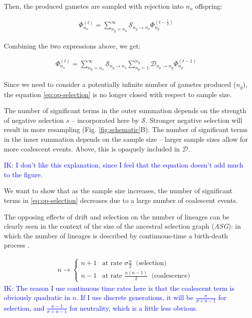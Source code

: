 \documentclass[review]{elsarticle}
\newcommand{\ra}{\rightarrow}
\newcommand{\afs}[2]{\Phi_{#1}^{(#2)}}
\newcommand{\ikcomment}[1]{\textcolor{blue}{IK: #1}}
\begin{document}
Then, the produced gametes are sampled with rejection into $n_o$ offspring:

\begin{align*}
  \afs{n_o}{t} = \sum_{n_g=n_o}^{\infty}\mathcal{S}_{n_g\ra n_o} \afs{n_g}{t-\frac{1}{2}}
\end{align*}

Combining the two expressions above, we get:

\begin{align}
  \label{eq:op-selection}
  \afs{n_o}{t} = \sum_{n_g=n_o}^{\infty} \mathcal{S}_{n_g\ra n_o} \sum_{n_p=1}^{n_g} \mathcal{D}_{n_p\ra n_g} \afs{n_p}{t-1}
\end{align}

Since we need to consider a potentially infinite number of gametes produced ($n_g$), the equation
\eqref{eq:op-selection} is no longer closed with respect to sample size.

The number of significant terms in the outer summation depends on the strength of negative selection
$s$ -- incorporated here by $\mathcal{S}$. Stronger negative selection will result in more resampling
(Fig. \ref{fig:schematic}B). The number of significant terms in the inner summation depends on
the sample size -- larger sample sizes allow for more coalescent events. Above, this is opaquely
included in $\mathcal{D}$.

\ikcomment{I don't like this explanation, since I feel that the equation doesn't add much to the
  figure.}

We want to show that as the sample size increases, the number of significant terms in
\eqref{eq:op-selection} decreases due to a large number of coalescent events.

The opposing effects of drift and selection on the number of lineages can be clearly seen in the
context of the size of the ancestral selection graph (\textit{ASG}): in which the number of lineages
is described by continuous-time a birth-death process \citep{KroneNeuhauser1997, Wakeley2009}.

\begin{align}
  \label{eq:asg-size}
  n \ra \begin{cases}
    n+1 & \text{at rate } \sigma \frac{n}{2} ~ \text{ (selection) }\\
    n-1 & \text{at rate } \frac{n(n-1)}{2}   ~ \text{ (coalescence) }
  \end{cases}
\end{align}
\ikcomment{The reason I use continuous time rates here is that the coalescent term is obviously
  quadratic in $n$. If I use discrete generations, it will be $\frac{\sigma}{\sigma+n-1}$ for
  selection, and $\frac{n-1}{\sigma+n-1}$ for neutrality, which is a little less obvious.}
\end{document}

